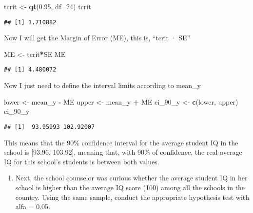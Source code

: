 \documentclass[
]{article}
\newenvironment{Shaded}{\begin{snugshade}}{\end{snugshade}}
\newcommand{\AttributeTok}[1]{\textcolor[rgb]{0.13,0.29,0.53}{#1}}
\newcommand{\DecValTok}[1]{\textcolor[rgb]{0.00,0.00,0.81}{#1}}
\newcommand{\FloatTok}[1]{\textcolor[rgb]{0.00,0.00,0.81}{#1}}
\newcommand{\FunctionTok}[1]{\textcolor[rgb]{0.13,0.29,0.53}{\textbf{#1}}}
\newcommand{\NormalTok}[1]{#1}
\newcommand{\OtherTok}[1]{\textcolor[rgb]{0.56,0.35,0.01}{#1}}
\newcommand{\SpecialCharTok}[1]{\textcolor[rgb]{0.81,0.36,0.00}{\textbf{#1}}}
\providecommand{\tightlist}{%
  \setlength{\itemsep}{0pt}\setlength{\parskip}{0pt}}
\begin{document}
\begin{Shaded}
\begin{Highlighting}[]
\NormalTok{tcrit }\OtherTok{\textless{}{-}} \FunctionTok{qt}\NormalTok{(}\FloatTok{0.95}\NormalTok{, }\AttributeTok{df=}\DecValTok{24}\NormalTok{)}
\NormalTok{tcrit}
\end{Highlighting}
\end{Shaded}

\begin{verbatim}
## [1] 1.710882
\end{verbatim}

Now I will get the Margin of Error (ME), this is, ``tcrit · SE''

\begin{Shaded}
\begin{Highlighting}[]
\NormalTok{ME }\OtherTok{\textless{}{-}}\NormalTok{ tcrit}\SpecialCharTok{*}\NormalTok{SE}
\NormalTok{ME}
\end{Highlighting}
\end{Shaded}

\begin{verbatim}
## [1] 4.480072
\end{verbatim}

Now I just need to define the interval limits according to mean\_y

\begin{Shaded}
\begin{Highlighting}[]
\NormalTok{lower }\OtherTok{\textless{}{-}}\NormalTok{ mean\_y }\SpecialCharTok{{-}}\NormalTok{ ME}
\NormalTok{upper }\OtherTok{\textless{}{-}}\NormalTok{ mean\_y }\SpecialCharTok{+}\NormalTok{ ME}
\NormalTok{ci\_90\_y }\OtherTok{\textless{}{-}} \FunctionTok{c}\NormalTok{(lower, upper)}
\NormalTok{ci\_90\_y}
\end{Highlighting}
\end{Shaded}

\begin{verbatim}
## [1]  93.95993 102.92007
\end{verbatim}

This means that the 90\% confidence interval for the average student IQ
in the school is {[}93.96, 103.92{]}, meaning that, with 90\% of
confidence, the real average IQ for this school's students is between
both values.

\begin{enumerate}
\def\labelenumi{\arabic{enumi}.}
\setcounter{enumi}{1}
\tightlist
\item
  Next, the school counselor was curious whether the average student IQ
  in her school is higher than the average IQ score (100) among all the
  schools in the country. Using the same sample, conduct the appropriate
  hypothesis test with alfa = 0.05.
\end{enumerate}
\end{document}
